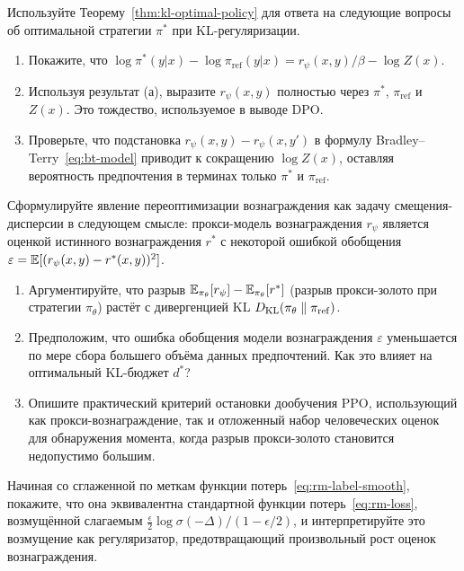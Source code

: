 \begin{exercise}
\label{ex:kl-optimal-policy}
Используйте Теорему~\ref{thm:kl-optimal-policy} для ответа на следующие вопросы об оптимальной стратегии $\pi^*$ при KL-регуляризации.
\begin{enumerate}
  \item Покажите, что $\log\pi^*(y|x) - \log\pi_{\mathrm{ref}}(y|x) = r_\psi(x,y)/\beta - \log Z(x)$.
  \item Используя результат (а), выразите $r_\psi(x,y)$ полностью через $\pi^*$, $\pi_{\mathrm{ref}}$ и $Z(x)$. Это тождество, используемое в выводе DPO.
  \item Проверьте, что подстановка $r_\psi(x,y) - r_\psi(x,y')$ в формулу Bradley--Terry~\eqref{eq:bt-model} приводит к сокращению $\log Z(x)$, оставляя вероятность предпочтения в терминах только $\pi^*$ и $\pi_{\mathrm{ref}}$.
\end{enumerate}
\end{exercise}

\begin{exercise}
\label{ex:goodhart}
Сформулируйте явление переоптимизации вознаграждения как задачу смещения-дисперсии в следующем смысле: прокси-модель вознаграждения $r_\psi$ является оценкой истинного вознаграждения $r^*$ с некоторой ошибкой обобщения $\varepsilon = \operatorname{\mathbb{E}}[(r_\psi(x,y) - r^*(x,y))^2]$.
\begin{enumerate}
  \item Аргументируйте, что разрыв $\operatorname{\mathbb{E}}_{\pi_\theta}[r_\psi] - \operatorname{\mathbb{E}}_{\pi_\theta}[r^*]$ (разрыв прокси-золото при стратегии $\pi_\theta$) растёт с дивергенцией KL $D_{\mathrm{KL}}\!\left(\pi_\theta\;\|\;\pi_{\mathrm{ref}}\right)$.
  \item Предположим, что ошибка обобщения модели вознаграждения $\varepsilon$ уменьшается по мере сбора большего объёма данных предпочтений. Как это влияет на оптимальный KL-бюджет $d^*$?
  \item Опишите практический критерий остановки дообучения PPO, использующий как прокси-вознаграждение, так и отложенный набор человеческих оценок для обнаружения момента, когда разрыв прокси-золото становится недопустимо большим.
\end{enumerate}
\end{exercise}

\begin{exercise}
\label{ex:label-smoothing}
Начиная со сглаженной по меткам функции потерь~\eqref{eq:rm-label-smooth}, покажите, что она эквивалентна стандартной функции потерь~\eqref{eq:rm-loss}, возмущённой слагаемым $\frac{\epsilon}{2}\log\sigma(-\Delta)/(1-\epsilon/2)$, и интерпретируйте это возмущение как регуляризатор, предотвращающий произвольный рост оценок вознаграждения.
\end{exercise}

